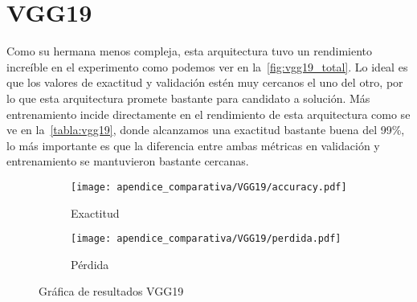 \section{VGG19}
Como su hermana menos compleja, esta arquitectura tuvo un rendimiento increíble en el experimento como
podemos ver en la~\autoref{fig:vgg19_total}. Lo ideal es que los valores de exactitud y validación
estén muy cercanos el uno del otro, por lo que esta arquitectura promete bastante para candidato a solución.
Más entrenamiento incide directamente en el rendimiento de esta arquitectura como se ve
en la~\autoref{tabla:vgg19}, donde alcanzamos una exactitud bastante buena del 99\%, lo más
importante es que la diferencia entre ambas métricas en validación y entrenamiento se mantuvieron
bastante cercanas.
\begin{figure}[H]
    \centering
    \begin{subfigure}[b]{0.8\textwidth}
        \centering
       \texttt{[image: apendice\_comparativa/VGG19/accuracy.pdf]}
       \caption{Exactitud}\label{fig:vgg19_acc} 
    \end{subfigure}

    \begin{subfigure}[b]{0.8\textwidth}
        \centering
       \texttt{[image: apendice\_comparativa/VGG19/perdida.pdf]}
       \caption{Pérdida}\label{fig:vgg19_loss}
    \end{subfigure}
    \caption{Gráfica de resultados VGG19}\label{fig:vgg19_total}
\end{figure}
